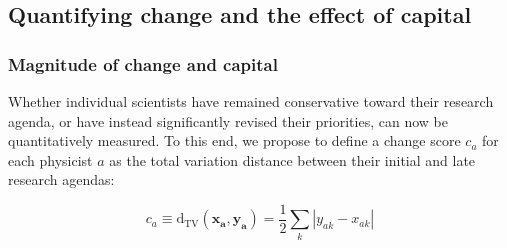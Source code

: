 \documentclass{article}
\begin{document}



\subsection{\label{sec:magnitude}Quantifying change and the effect of capital}

\subsubsection{Magnitude of change and capital}

Whether individual scientists have remained  conservative toward their research agenda, or have instead significantly revised their priorities, can now be quantitatively measured. To this end, we propose to define a change score $c_a$ for each physicist $a$ as the total variation distance between their initial and late research agendas:

\begin{equation}
    c_a \equiv \mathrm{d}_{\text{TV}}(\bm{x_a},\bm{y_a}) = \frac{1}{2} \sum_k |y_{ak}-x_{ak}|
\end{equation}
\end{document}
